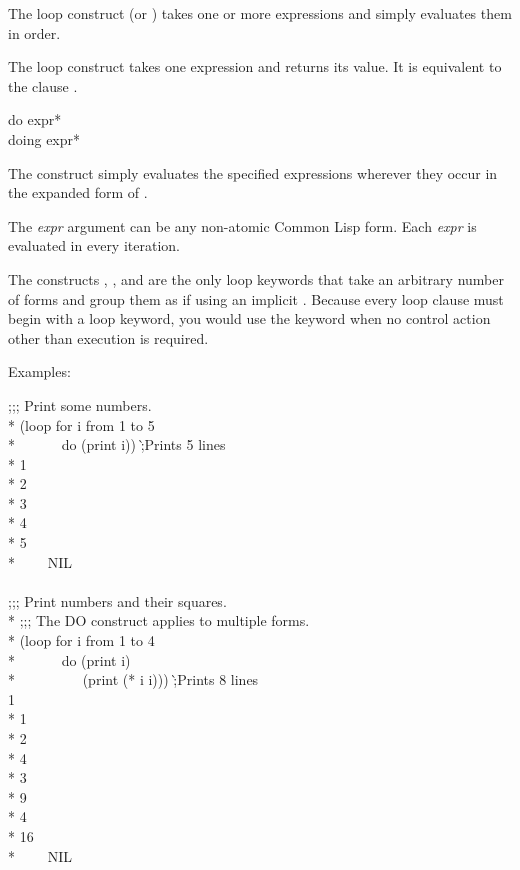 The loop construct  (or ) takes one or more expressions
and simply evaluates them in order.

The loop construct  takes one expression and returns its value.  It 
is equivalent to the clause .

\begin{defloop}
do {expr}* \\
doing {expr}*

The  construct simply evaluates the specified expressions
wherever they occur in the expanded form of .

The {\it expr\/} argument can be any non-atomic Common Lisp form.
Each {\it expr\/} is evaluated in every iteration.

The constructs , , and  are the
only loop keywords that take an arbitrary number of forms and group
them as if using an implicit .  
Because every loop clause must begin with a loop keyword, you would use
the keyword  when no control action other than execution is 
required.

Examples:
\begin{lisp}
;;; Print some numbers. \\*
(loop for i from 1 to 5 \\*
~~~~~~do (print i)) \`;{\rm Prints 5 lines} \\*
1 \\*
2 \\*
3 \\*
4 \\*
5 \\*
~~~\EV~NIL \\
 \\
;;; Print numbers and their squares. \\*
;;; The DO construct applies to multiple forms. \\*
(loop for i from 1 to 4 \\*
~~~~~~do (print i) \\*
~~~~~~~~~(print (* i i))) \`;{\rm Prints 8 lines} \\
1  \\*
1  \\*
2  \\*
4  \\*
3  \\*
9  \\*
4  \\*
16  \\*
~~~\EV~NIL
\end{lisp}
\end{defloop}


